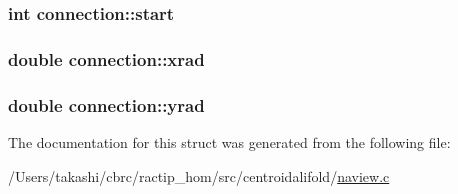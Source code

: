 \hypertarget{structconnection_af0bdfc181a339d06558a27aca2177f96}{
\subsubsection[{start}]{\setlength{\rightskip}{0pt plus 5cm}int connection\+::start}}\label{structconnection_af0bdfc181a339d06558a27aca2177f96}
\hypertarget{structconnection_ae93b041e3b4c184d0a155a2cfa8ffdea}{
\subsubsection[{xrad}]{\setlength{\rightskip}{0pt plus 5cm}double connection\+::xrad}}\label{structconnection_ae93b041e3b4c184d0a155a2cfa8ffdea}
\hypertarget{structconnection_a2c32ebb1b452d1c8d3184f2bcfa23083}{
\subsubsection[{yrad}]{\setlength{\rightskip}{0pt plus 5cm}double connection\+::yrad}}\label{structconnection_a2c32ebb1b452d1c8d3184f2bcfa23083}


The documentation for this struct was generated from the following file\+:\begin{DoxyCompactItemize}
\item 
/\+Users/takashi/cbrc/ractip\+\_\+hom/src/centroidalifold/\hyperlink{naview_8c}{naview.\+c}\end{DoxyCompactItemize}
